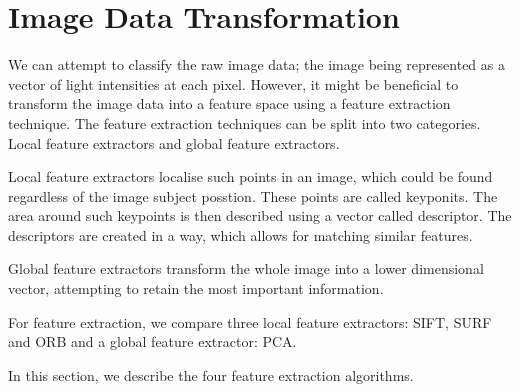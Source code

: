 \chapter{Image Data Transformation}

We can attempt to classify the raw image data; the image being represented as a vector of light intensities at each pixel. However, it might be beneficial to transform the image data into a feature space using a feature extraction technique. The feature extraction techniques can be split into two categories. Local feature extractors and global feature extractors. %

Local feature extractors localise such points in an image, which could be found regardless of the image subject posstion. These points are called keyponits. The area around such keypoints is then described using a vector called descriptor. The descriptors are created in a way, which allows for matching similar features.

Global feature extractors transform the whole image into a lower dimensional vector, attempting to retain the most important information.

For feature extraction, we compare three local feature extractors: SIFT, SURF and ORB and a global feature extractor: PCA.

In this section, we describe the four feature extraction algorithms.









